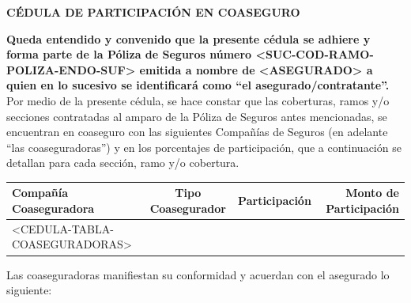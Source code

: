 \documentclass[letterpaper,10pt]{article}
\begin{document}
\begin{center}
    \textbf{CÉDULA DE PARTICIPACIÓN EN COASEGURO}
\end{center}

\textbf{Queda entendido y convenido que la presente cédula se adhiere y forma parte de la Póliza de Seguros número <SUC-COD-RAMO-POLIZA-ENDO-SUF> emitida a nombre de <ASEGURADO> a quien en lo sucesivo se identificará como ``el asegurado/contratante''.}\\

Por medio de la presente cédula, se hace constar que las coberturas, ramos y/o secciones contratadas al amparo de la Póliza de Seguros antes mencionadas, se encuentran en coaseguro con las siguientes Compañías de Seguros (en adelante ``las coaseguradoras'') y en los porcentajes de participación, que a continuación se detallan para cada sección, ramo y/o cobertura.

\begin{center}
    \begin{tabularx}{\textwidth}{|X|c|c|r|}
        \hline
        \textbf{Compañía Coaseguradora} & \textbf{Tipo Coasegurador} & \textbf{Participación} & \textbf{Monto de Participación}\\\hline
        <CEDULA-TABLA-COASEGURADORAS>
    \end{tabularx}
\end{center}

Las coaseguradoras manifiestan su conformidad y acuerdan con el asegurado lo siguiente:
\end{document}
